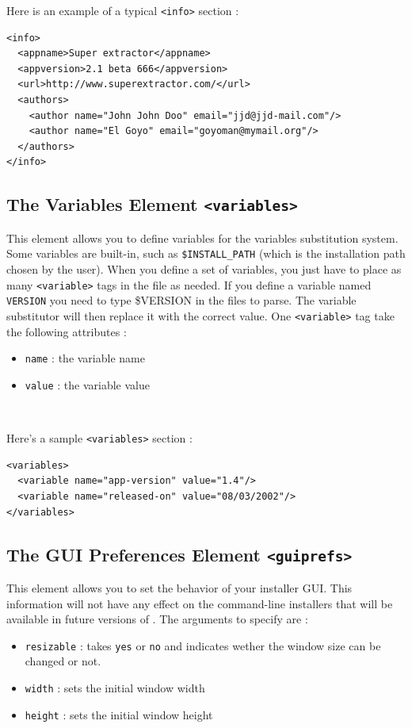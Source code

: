 Here is an example of a typical \texttt{<info>} section :\\
\footnotesize
\begin{verbatim}
<info>
  <appname>Super extractor</appname>
  <appversion>2.1 beta 666</appversion>
  <url>http://www.superextractor.com/</url>
  <authors>
    <author name="John John Doo" email="jjd@jjd-mail.com"/>
    <author name="El Goyo" email="goyoman@mymail.org"/>
  </authors>
</info>
\end{verbatim}
\normalsize

\subsection{The Variables Element \texttt{<variables>}}

This element allows you to define variables for the variables
substitution system. Some variables are built-in, such as
\texttt{\$INSTALL\_PATH} (which is the installation path chosen by the
user). When you define a set of variables, you just have to place as
many \texttt{<variable>} tags in the file as needed. If you define a
variable named \texttt{VERSION} you need to type \$VERSION in the files
to parse. The variable substitutor will then replace it with the correct
value. One \texttt{<variable>} tag take the following attributes :
\begin{itemize}

  \item \texttt{name} : the variable name
  \item \texttt{value} : the variable value

\end{itemize}\

Here's a sample \texttt{<variables>} section :\\
\footnotesize
\begin{verbatim}
<variables>
  <variable name="app-version" value="1.4"/>
  <variable name="released-on" value="08/03/2002"/>
</variables>
\end{verbatim}
\normalsize

\subsection{The GUI Preferences Element \texttt{<guiprefs>}}

This element allows you to set the behavior of your installer GUI. This
information will not have any effect on the command-line installers that will be
available in future versions of \IzPack. The arguments to specify are :
\begin{itemize}

  \item \texttt{resizable} : takes \texttt{yes} or \texttt{no} and indicates
  wether the window size can be changed or not.
  \item \texttt{width} : sets the initial window width
  \item \texttt{height} : sets the initial window height
  
\end{itemize}\

